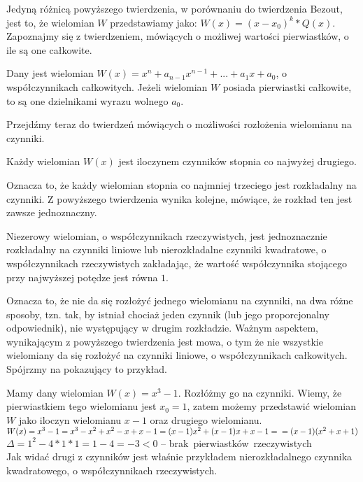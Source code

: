 Jedyną różnicą powyższego twierdzenia, w porównaniu do twierdzenia Bezout, jest to, że wielomian $W$ przedstawiamy jako: $W(x) = (x-x_0)^k * Q(x)$. Zapoznajmy się z twierdzeniem, mówiących o możliwej wartości pierwiastków, o ile są one całkowite.

\begin{theorem}
	$ $\\
	Dany jest wielomian $W(x) = x^n + a_{n-1}x^{n-1} + ... + a_1x + a_0$, o współczynnikach całkowitych. Jeżeli wielomian $W$ posiada pierwiastki całkowite, to są one dzielnikami wyrazu wolnego $a_0$.
\end{theorem}

Przejdźmy teraz do twierdzeń mówiących o możliwości rozłożenia wielomianu na czynniki.

\begin{theorem}
	$ $\\
	Każdy wielomian $W(x)$ jest iloczynem czynników stopnia co najwyżej drugiego.
\end{theorem}

Oznacza to, że każdy wielomian stopnia co najmniej trzeciego jest rozkładalny na czynniki. Z powyższego twierdzenia wynika kolejne, mówiące, że rozkład ten jest zawsze jednoznaczny.

\begin{theorem}
	$ $\\
	Niezerowy wielomian, o współczynnikach rzeczywistych, jest jednoznacznie rozkładalny na czynniki liniowe lub nierozkładalne czynniki kwadratowe, o współczynnikach rzeczywistych zakładając, że wartość współczynnika stojącego przy najwyższej potędze jest równa $1$.
\end{theorem}

Oznacza to, że nie da się rozłożyć jednego wielomianu na czynniki, na dwa różne sposoby, tzn. tak, by istniał chociaż jeden czynnik (lub jego proporcjonalny odpowiednik), nie występujący w drugim rozkładzie. Ważnym aspektem, wynikającym z powyższego twierdzenia jest mowa, o tym że nie wszystkie wielomiany da się rozłożyć na czynniki liniowe, o współczynnikach całkowitych. Spójrzmy na pokazujący to przykład.

\begin{example}
	$ $\\
	Mamy dany wielomian $W(x)=x^3-1$. Rozłóżmy go na czynniki.
	Wiemy, że pierwiastkiem tego wielomianu jest $x_0 = 1$, zatem możemy przedstawić wielomian $W$ jako iloczyn wielomianu $x-1$ oraz drugiego wielomianu. \\
	$W(x)=x^3-1=x^3-x^2+x^2-x+x-1=(x-1)x^2+(x-1)x+x-1 = \\
	=(x-1)(x^2+x+1)$ \\
	$\Delta = 1^2 - 4*1*1 = 1 - 4 = -3 < 0$ -- brak\ pierwiastków\ rzeczywistych\\
	Jak widać drugi z czynników jest właśnie przykładem nierozkładalnego czynnika kwadratowego, o współczynnikach rzeczywistych.
\end{example}

